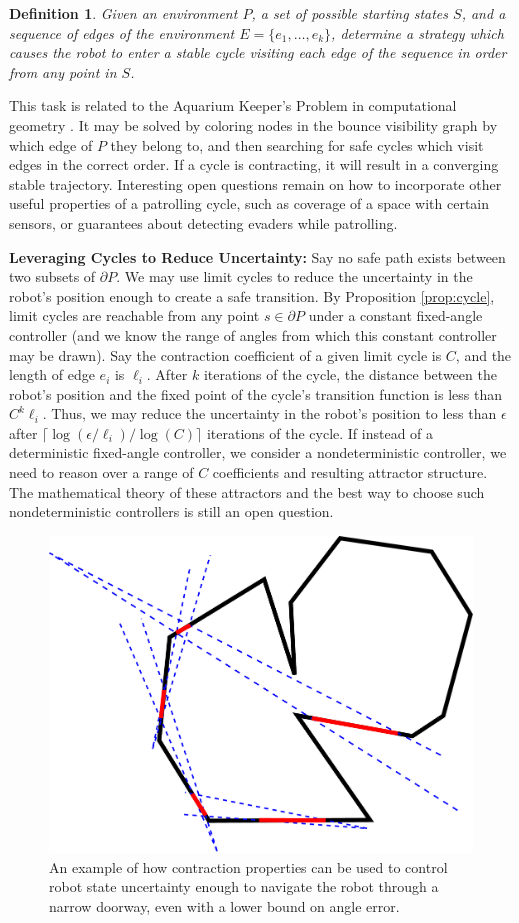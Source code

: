\documentclass[]{article}
\newtheorem{definition}{Definition}
\begin{document}
\begin{definition}
Given an environment $P$, a set of possible starting states $S$, and
a sequence of edges of the environment $E = \{e_1, \ldots, e_k\}$,
determine a strategy which causes the robot to enter a stable cycle visiting 
each edge of the sequence in order from any point in $S$.
\end{definition}

This task is related to the Aquarium Keeper's Problem in computational
geometry \cite{czyzowicz1991aquarium}. It may be solved by coloring nodes in the
bounce visibility graph by which edge of $P$ they belong to, and then searching
for safe cycles which visit edges in the correct order. If a cycle is
contracting, it will result in a converging stable trajectory. Interesting open questions remain on how to incorporate other useful properties of a
patrolling cycle, such as coverage of a space with certain sensors, or guarantees
about detecting evaders while patrolling.

\textbf{Leveraging Cycles to Reduce Uncertainty:}
Say no safe path exists between two subsets of $\partial P$. We may
use limit cycles to reduce the uncertainty in the robot's position enough to
create a safe transition. By Proposition \ref{prop:cycle}, limit cycles are reachable from any point $s
\in \partial P$ under a constant fixed-angle controller (and we know the range
of angles from which this constant controller may be drawn). Say the contraction 
coefficient of a given limit cycle is $C$, and the length of edge $e_i$ is
$\ell_i$. After $k$ iterations of the cycle,
the distance between the robot's position and the fixed point of the cycle's transition
function is less than $C^k \ell_i$. Thus,
we may reduce the uncertainty in the robot's position to less than $\epsilon$
after $\lceil \log(\epsilon/\ell_i)/\log(C) \rceil$ iterations of the 
cycle. If instead of a deterministic fixed-angle controller, we consider a
nondeterministic controller, we need to
reason over a range of $C$ coefficients and resulting attractor structure. 
The mathematical theory of these attractors and the best way to choose such
nondeterministic controllers is still an open question.

\begin{figure}
    \includegraphics[width=0.6\linewidth]{figures/bounce_preimages.pdf}
    \centering
    \caption{An example of how contraction properties can be used to control
robot state uncertainty enough to navigate the robot through a narrow doorway,
even with a lower bound on angle error.}
\label{fig:preimage_example}
\end{figure}
\end{document}
